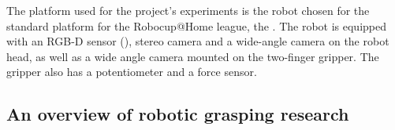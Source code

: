 The platform used for the project's experiments is the robot chosen for the standard platform for the Robocup@Home
league, the
\cite{robocupRulebook2018}. The robot is equipped with an RGB-D sensor
(), stereo camera and a wide-angle camera
on the robot head, as well as a wide angle camera mounted on the two-finger gripper. The gripper also has a
potentiometer and a force sensor.

\subsection{An overview of robotic grasping research} \label{sub:overview}

